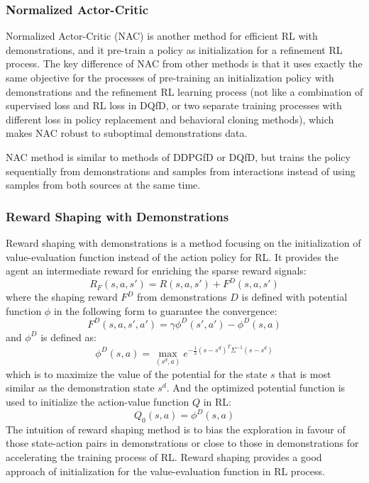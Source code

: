 \documentclass{article}
\begin{document}
\subsubsection{Normalized Actor-Critic}
Normalized Actor-Critic (NAC) \cite{gao2018reinforcement} is another method for efficient RL with demonstrations, and it pre-train a policy as initialization for a refinement RL process. The key difference of NAC from other methods is that it uses exactly the same objective for the processes of pre-training an initialization policy with demonstrations and the refinement RL learning process (not like a combination of supervised loss and RL loss in DQfD, or two separate training processes with different loss in policy replacement and behavioral cloning methods), which makes NAC robust to suboptimal demonstrations data.

NAC method is similar to methods of DDPGfD or DQfD, but trains the policy sequentially from demonstrations and samples from interactions instead of using samples from both sources at the same time.

\subsubsection{Reward Shaping with Demonstrations}
Reward shaping with demonstrations \cite{brys2015reinforcement} is a method focusing on the initialization of value-evaluation function instead of the action policy for RL. It provides the agent an intermediate reward for enriching the sparse reward signals:
\begin{equation}
    R_F(s,a,s')=R(s,a,s')+F^D(s,a,s')
\end{equation}
where the shaping reward $F^D$ from demonstrations $D$ is defined with potential function $\phi$ in the following form to guarantee the convergence:
\begin{equation}
    F^D(s,a,s',a')=\gamma \phi^D(s',a')-\phi^D(s,a)
\end{equation}
and $\phi^D$ is defined as:
\begin{equation}
    \phi^D(s,a)=\max_{(s^d, a)}e^{-\frac{1}{2}(s-s^d)^T\Sigma^{-1}(s-s^d)}
\end{equation}
which is to maximize the value of the potential for the state $s$ that is most similar as the demonstration state $s^d$. And the optimized potential function is used to initialize the action-value function $Q$ in RL:
\begin{equation}
 Q_0(s,a)=\phi^D(s,a)   
\end{equation}
The intuition of reward shaping method is to bias the exploration in favour of those state-action pairs in demonstrations or close to those in demonstrations for accelerating the training process of RL. Reward shaping provides a good approach of initialization for the value-evaluation function in RL process. 
\end{document}

